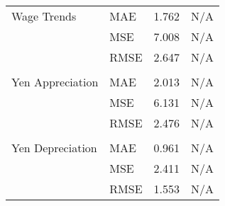 \documentclass[a4paper,12pt]{article}
\begin{document}
\begin{table}
\begin{tabular}{llcc}
Wage Trends & MAE & 1.762 & N/A \\
 & MSE & 7.008 & N/A \\
 & RMSE & 2.647 & N/A \\
\arrayrulecolor{black!30}\midrule &  &  &  \\
Yen Appreciation & MAE & 2.013 & N/A \\
 & MSE & 6.131 & N/A \\
 & RMSE & 2.476 & N/A \\
\arrayrulecolor{black!30}\midrule &  &  &  \\
Yen Depreciation & MAE & 0.961 & N/A \\
 & MSE & 2.411 & N/A \\
 & RMSE & 1.553 & N/A \\
\bottomrule
\end{tabular}
\end{table}
\end{document}
